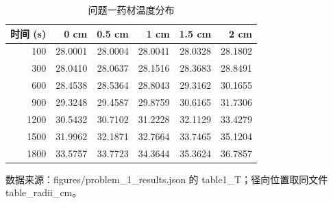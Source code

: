 \begin{table}[H]
  \centering
  \caption{问题一药材温度分布}
  \label{tab:q1_T}
  \begin{tabular}{rrrrrr}
    \toprule
    时间 (s) & 0 cm & 0.5 cm & 1 cm & 1.5 cm & 2 cm \\
    \midrule
    100 & 28.0001 & 28.0004 & 28.0041 & 28.0328 & 28.1802 \\
    300 & 28.0410 & 28.0637 & 28.1516 & 28.3683 & 28.8491 \\
    600 & 28.4538 & 28.5364 & 28.8043 & 29.3162 & 30.1655 \\
    900 & 29.3248 & 29.4587 & 29.8759 & 30.6165 & 31.7306 \\
    1200 & 30.5432 & 30.7102 & 31.2228 & 32.1129 & 33.4279 \\
    1500 & 31.9962 & 32.1871 & 32.7664 & 33.7465 & 35.1204 \\
    1800 & 33.5757 & 33.7723 & 34.3644 & 35.3624 & 36.7857 \\
    \bottomrule
  \end{tabular}
  \par\vspace{2pt}\footnotesize 数据来源：figures/problem\_1\_results.json 的 table1\_T；径向位置取同文件 table\_radii\_cm。
\end{table}
